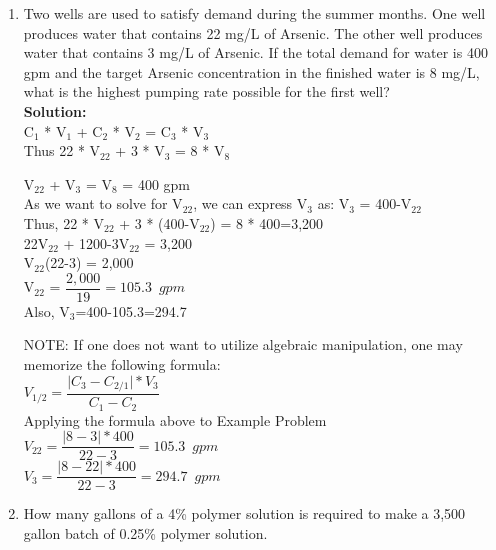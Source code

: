\begin{enumerate}[1.]
\item Two wells are used to satisfy demand during the summer months. One well produces water that contains 22 mg/L of Arsenic. The other well produces water that contains 3 mg/L of Arsenic. If the total demand for water is 400 gpm and the target Arsenic concentration in the finished water is 8 mg/L, what is the highest pumping rate possible for the first well?\\
\vspace{0.3cm}
\textbf{Solution:}\\
C$_1$ * V$_1$ + C$_2$ * V$_2$ =  C$_3$ * V$_3$\\
\vspace{0.3cm}
Thus 22 * V$_{22}$ + 3 * V$_3$ =  8 * V$_8$\\
\vspace{0.3cm}

V$_{22}$ + V$_3$ = V$_8$ = 400 gpm\\
\vspace{0.3cm}
As we want to solve for V$_{22}$, we can express V$_3$ as: V$_3$ = 400-V$_{22}$\\
\vspace{0.3cm}
Thus, 22 * V$_{22}$ + 3 * (400-V$_{22}$) =  8 * 400=3,200\\
\vspace{0.3cm}
22V$_{22}$ + 1200-3V$_{22}$ =  3,200\\
\vspace{0.3cm}
V$_{22}$(22-3) =  2,000\\
\vspace{0.3cm}
V$_{22}$ = $ \dfrac{2,000}{19}=\boxed{105.3 \enspace gpm}$\\
\vspace{0.3cm}
Also, V$_3$=400-105.3=294.7\\
\vspace{0.3cm}

NOTE:  If one does not want to utilize algebraic manipulation, one may memorize the following formula:\\
\vspace{0.3cm}
$V_{1/2}=\dfrac{\lvert C_3 - C_{2/1}\rvert*V_3}{C_1-C_2}$\\
\vspace{0.3cm}
Applying the formula above to Example Problem\\
\vspace{0.3cm}
$V_{22}=\dfrac{\lvert 8 - 3\rvert*400}{22-3}=\boxed{105.3 \enspace gpm}$\\
\vspace{0.3cm}
$V_{3}=\dfrac{\lvert 8 - 22\rvert*400}{22-3}=\boxed{294.7 \enspace gpm}$\\
\vspace{0.3cm}
\item How many gallons of a 4\% polymer solution is required to make a 3,500 gallon batch of 0.25\% polymer solution.\\


\end{enumerate}
